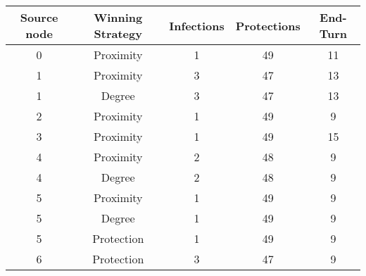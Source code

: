 \documentclass[results.tex]{subfiles}
\begin{document}
    \begin{center}
        \begin{tabular}{| c || c | c | c | c |}
            \hline
            {\bfseries Source node} & {\bfseries Winning Strategy} & {\bfseries Infections} & {\bfseries Protections}
            & {\bfseries End-Turn}
            \\  %
            \hline\hline
            0                       & Proximity                    & 1                      & 49                      & 11                   \\
            \hline
            1                       & Proximity                    & 3                      & 47                      & 13                   \\
            \hline
            1                       & Degree                       & 3                      & 47                      & 13                   \\
            \hline
            2                       & Proximity                    & 1                      & 49                      & 9                    \\
            \hline
            3                       & Proximity                    & 1                      & 49                      & 15                   \\
            \hline
            4                       & Proximity                    & 2                      & 48                      & 9                    \\
            \hline
            4                       & Degree                       & 2                      & 48                      & 9                    \\
            \hline
            5                       & Proximity                    & 1                      & 49                      & 9                    \\
            \hline
            5                       & Degree                       & 1                      & 49                      & 9                    \\
            \hline
            5                       & Protection                   & 1                      & 49                      & 9                    \\
            \hline
            6                       & Protection                   & 3                      & 47                      & 9                    \\

\end{tabular}
\end{center}
\end{document}
